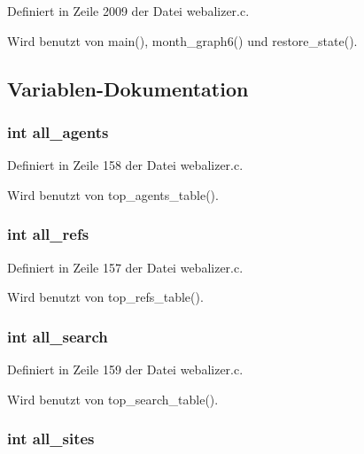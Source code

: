 Definiert in Zeile 2009 der Datei webalizer.c.

Wird benutzt von main(), month\_\-graph6() und restore\_\-state().

\subsection{Variablen-Dokumentation}
\subsubsection{\setlength{\rightskip}{0pt plus 5cm}int {\bf all\_\-agents}}\label{webalizer_8h_e6a5e084455a29d95c410b6e6f509c07}




Definiert in Zeile 158 der Datei webalizer.c.

Wird benutzt von top\_\-agents\_\-table().
\subsubsection{\setlength{\rightskip}{0pt plus 5cm}int {\bf all\_\-refs}}\label{webalizer_8h_5d9ecc711cb4edb47133e9c8329a2f6a}




Definiert in Zeile 157 der Datei webalizer.c.

Wird benutzt von top\_\-refs\_\-table().
\subsubsection{\setlength{\rightskip}{0pt plus 5cm}int {\bf all\_\-search}}\label{webalizer_8h_f51b93932a98e306bd47239ec9c99f23}




Definiert in Zeile 159 der Datei webalizer.c.

Wird benutzt von top\_\-search\_\-table().
\subsubsection{\setlength{\rightskip}{0pt plus 5cm}int {\bf all\_\-sites}}\label{webalizer_8h_e80c0d7d06836110749922f34dd902c2}




